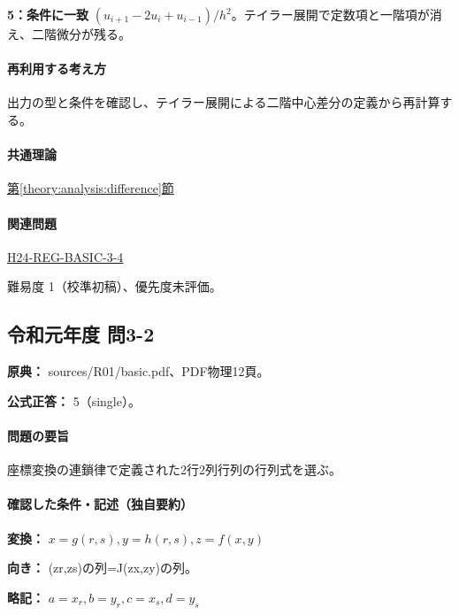 \noindent\textbf{5：条件に一致} \((u_{i+1}-2u_i+u_{i-1})/h^2\)。テイラー展開で定数項と一階項が消え、二階微分が残る。\par

\paragraph{再利用する考え方} 出力の型と条件を確認し、テイラー展開による二階中心差分の定義から再計算する。

\paragraph{共通理論} \hyperref[theory:analysis:difference]{第\ref*{theory:analysis:difference}節}

\paragraph{関連問題} \hyperref[q:h24-reg-basic-3-4]{H24-REG-BASIC-3-4}

\par 難易度 1（校準初稿）、優先度未評価。

\subsection{令和元年度 問3-2}
\label{q:r01-reg-basic-3-2}

\noindent\textbf{原典：} sources/R01/basic.pdf、PDF物理12頁。

\textbf{公式正答：} 5（single）。

\paragraph{問題の要旨} 座標変換の連鎖律で定義された2行2列行列の行列式を選ぶ。

\paragraph{確認した条件・記述（独自要約）}\mbox{}\par

\noindent\textbf{変換：} \(x=g(r,s),y=h(r,s),z=f(x,y)\)\par

\noindent\textbf{向き：} (zr,zs)の列=J(zx,zy)の列。\par

\noindent\textbf{略記：} \(a=x_r,b=y_r,c=x_s,d=y_s\)\par

